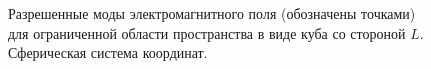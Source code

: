 \begin{figure}
\centering

\caption{Разрешенные моды электромагнитного поля (обозначены точками) для ограниченной
  области пространства в виде куба со стороной $L$. Сферическая
  система координат.}
\label{figCh1_pic4}
\end{figure}

